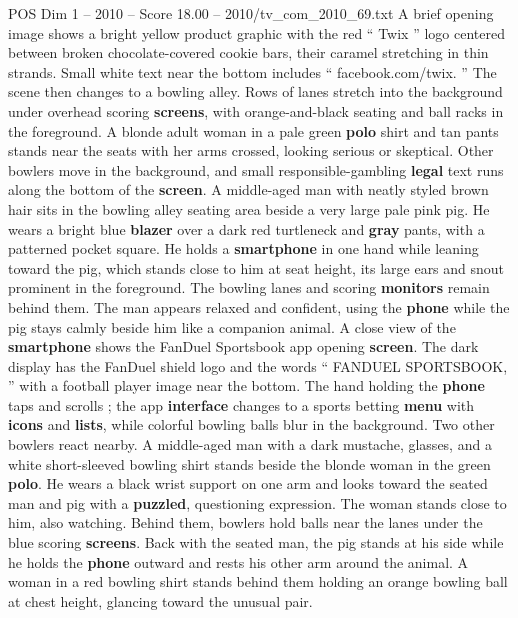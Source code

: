 \begin{textsample}{POS Dim 1 – 2010 – Score 18.00 – 2010/tv\_com\_2010\_69.txt}  \label{ex:f1_pos_022}
A brief opening image shows a bright yellow product graphic with the red “ Twix ” logo centered between broken chocolate-covered cookie bars, their caramel stretching in thin strands.
Small white text near the bottom includes “ facebook.com/twix. ” The scene then changes to a bowling alley.
Rows of lanes stretch into the background under overhead scoring \textbf{screens}, with orange-and-black seating and ball racks in the foreground.
A blonde adult woman in a pale green \textbf{polo} shirt and tan pants stands near the seats with her arms crossed, looking serious or skeptical.
Other bowlers move in the background, and small responsible-gambling \textbf{legal} text runs along the bottom of the \textbf{screen}.
A middle-aged man with neatly styled brown hair sits in the bowling alley seating area beside a very large pale pink pig.
He wears a bright blue \textbf{blazer} over a dark red turtleneck and \textbf{gray} pants, with a patterned pocket square.
He holds a \textbf{smartphone} in one hand while leaning toward the pig, which stands close to him at seat height, its large ears and snout prominent in the foreground.
The bowling lanes and scoring \textbf{monitors} remain behind them.
The man appears relaxed and confident, using the \textbf{phone} while the pig stays calmly beside him like a companion animal.
A close view of the \textbf{smartphone} shows the FanDuel Sportsbook app opening \textbf{screen}.
The dark display has the FanDuel shield logo and the words “ FANDUEL SPORTSBOOK, ” with a football player image near the bottom.
The hand holding the \textbf{phone} taps and scrolls ; the app \textbf{interface} changes to a sports betting \textbf{menu} with \textbf{icons} and \textbf{lists}, while colorful bowling balls blur in the background.
Two other bowlers react nearby.
A middle-aged man with a dark mustache, glasses, and a white short-sleeved bowling shirt stands beside the blonde woman in the green \textbf{polo}.
He wears a black wrist support on one arm and looks toward the seated man and pig with a \textbf{puzzled}, questioning expression.
The woman stands close to him, also watching.
Behind them, bowlers hold balls near the lanes under the blue scoring \textbf{screens}.
Back with the seated man, the pig stands at his side while he holds the \textbf{phone} outward and rests his other arm around the animal.
A woman in a red bowling shirt stands behind them holding an orange bowling ball at chest height, glancing toward the unusual pair.

\end{textsample}
